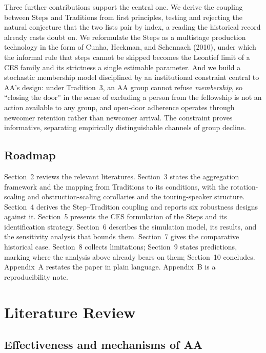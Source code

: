 \documentclass[11pt,a4paper]{article}
\begin{document}
Three further contributions support the central one. We derive the coupling
between Steps and Traditions from first principles, testing and rejecting the
natural conjecture that the two lists pair by index, a reading the historical
record already casts doubt on. We reformulate the Steps as a multistage production
technology in the form of Cunha, Heckman, and Schennach (2010), under which the
informal rule that steps cannot be skipped becomes the Leontief limit of a CES
family and its strictness a single estimable parameter. And we build a stochastic
membership model disciplined by an institutional constraint central to AA's
design: under Tradition~3, an AA group cannot refuse \emph{membership}, so
``closing the door'' in the sense of excluding a person from the fellowship is not
an action available to any group, and open-door adherence operates through
newcomer retention rather than newcomer arrival. The constraint proves
informative, separating empirically distinguishable channels of group decline.

\subsection{Roadmap}

Section~2 reviews the relevant literatures. Section~3 states the aggregation
framework and the mapping from Traditions to its conditions, with the
rotation-scaling and obstruction-scaling corollaries and the touring-speaker
structure. Section~4 derives the Step--Tradition coupling and reports six
robustness designs against it. Section~5 presents the CES formulation of the Steps
and its identification strategy. Section~6 describes the simulation model, its
results, and the sensitivity analysis that bounds them. Section~7 gives the
comparative historical case. Section~8 collects limitations; Section~9 states
predictions, marking where the analysis above already bears on them; Section~10
concludes. Appendix~A restates the paper in plain language. Appendix~B is a
reproducibility note.

\section{Literature Review}

\subsection{Effectiveness and mechanisms of AA}
\label{sec:lit-effect}
\end{document}
